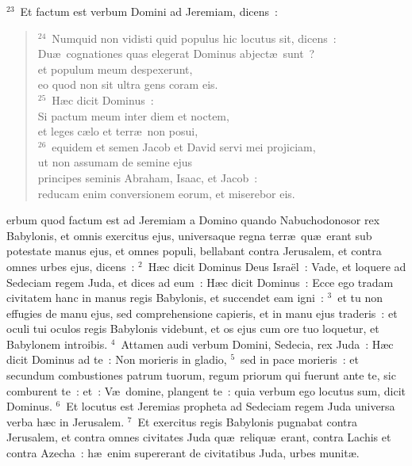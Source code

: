 ${}^{23}$~Et factum est verbum Domini ad Jeremiam, dicens~:
\begin{flushleft}\begin{verse}${}^{24}$~Numquid non vidisti quid populus hic locutus sit, dicens~:\\ Du\ae\ cognationes quas elegerat Dominus abject\ae\ sunt~?\\ et populum meum despexerunt,\\ eo quod non sit ultra gens coram eis.\\
${}^{25}$~H\ae c dicit Dominus~:\\ Si pactum meum inter diem et noctem,\\ et leges c\ae lo et terr\ae\ non posui,\\
${}^{26}$~equidem et semen Jacob et David servi mei projiciam,\\ ut non assumam de semine ejus\\ principes seminis Abraham, Isaac, et Jacob~:\\ reducam enim conversionem eorum, et miserebor eis.\end{verse}\end{flushleft}



\bchapter
{}erbum quod factum est ad Jeremiam a Domino quando Nabuchodonosor rex Babylonis, et omnis exercitus ejus, universaque regna terr\ae\ qu\ae\ erant sub potestate manus ejus, et omnes populi, bellabant contra Jerusalem, et contra omnes urbes ejus, dicens~:
${}^{2}$~H\ae c dicit Dominus Deus Isra\"el~: Vade, et loquere ad Sedeciam regem Juda, et dices ad eum~: H\ae c dicit Dominus~: Ecce ego tradam civitatem hanc in manus regis Babylonis, et succendet eam igni~:
${}^{3}$~et tu non effugies de manu ejus, sed comprehensione capieris, et in manu ejus traderis~: et oculi tui oculos regis Babylonis videbunt, et os ejus cum ore tuo loquetur, et Babylonem introibis.
${}^{4}$~Attamen audi verbum Domini, Sedecia, rex Juda~: H\ae c dicit Dominus ad te~: Non morieris in gladio,
${}^{5}$~sed in pace morieris~: et secundum combustiones patrum tuorum, regum priorum qui fuerunt ante te, sic comburent te~: et~: V\ae\ domine, plangent te~: quia verbum ego locutus sum, dicit Dominus.
${}^{6}$~Et locutus est Jeremias propheta ad Sedeciam regem Juda universa verba h\ae c in Jerusalem.
${}^{7}$~Et exercitus regis Babylonis pugnabat contra Jerusalem, et contra omnes civitates Juda qu\ae\ reliqu\ae\ erant, contra Lachis et contra Azecha~: h\ae\ enim supererant de civitatibus Juda, urbes munit\ae .


